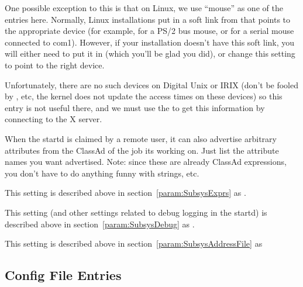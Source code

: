 \begin{description}
  One possible exception to this is that on Linux, we use ``mouse'' as
  one of the entries here.  Normally, Linux installations put in a
  soft link from  that points to the appropriate
  device (for example,  for a PS/2 bus mouse, or
   for a serial mouse connected to com1).  However,
  if your installation doesn't have this soft link, you will either
  need to put it in (which you'll be glad you did), or change this
  setting to point to the right device. 
  
  Unfortunately, there are no such devices on Digital Unix or IRIX
  (don't be fooled by , etc, the kernel does not
  update the access times on these devices) so this entry is not
  useful there, and we must use the  to get this
  information by connecting to the X server.
  
\item[\Macro{STARTD\_JOB\_EXPRS}] \label{param:StartdJobExprs} When
  the startd is claimed by a remote user, it can also advertise
  arbitrary attributes from the ClassAd of the job its working on.
  Just list the attribute names you want advertised.  Note: since
  these are already ClassAd expressions, you don't have to do anything
  funny with strings, etc.

\item[\Macro{STARTD\_EXPRS}] \label{param:StartdExprs} This setting is
  described above in section~\ref{param:SubsysExprs} as
  .

\item[\Macro{STARTD\_DEBUG}] \label{param:StartdDebug} This setting
  (and other settings related to debug logging in the startd) is
  described above in section~\ref{param:SubsysDebug} as
  .

\item[\Macro{STARTD\_ADDRESS\_FILE}] \label{param:StartdAddressFile}
  This setting is described above in
  section~\ref{param:SubsysAddressFile} as

\end{description}

\subsection{ Config File Entries}
\label{sec:Schedd-Config-File-Entries}

